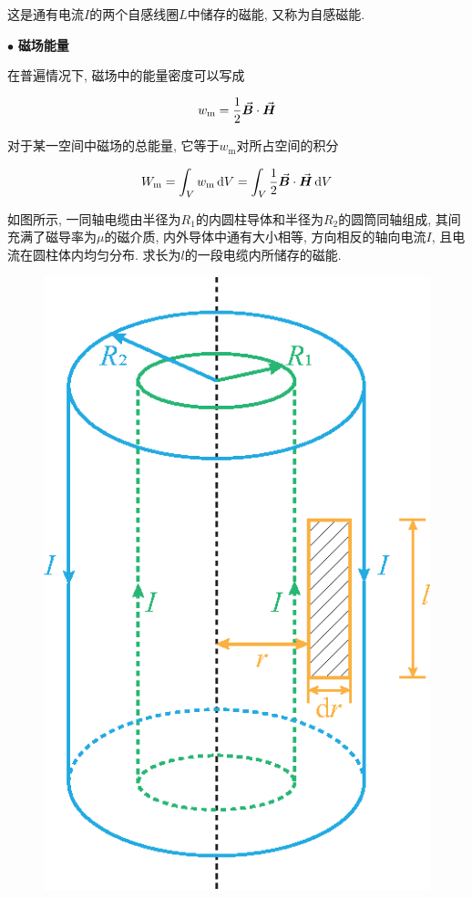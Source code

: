 这是通有电流$I$的两个自感线圈$L$中储存的磁能, 又称为自感磁能. 

$\bullet$ \textbf{磁场能量}

在普遍情况下, 磁场中的能量密度可以写成

\begin{equation}
	w_{\textrm{m}} = \dfrac{1}{2} \va*{B} \cdot \va*{H} \label{C9-eq19}
\end{equation}

对于某一空间中磁场的总能量, 它等于$w_{\textrm{m}}$对所占空间的积分

\begin{equation}
	W_{\textrm{m}} = \int_{V} w_{\textrm{m}} \dd{V} = \int_{V} \dfrac{1}{2} \va*{B} \cdot \va*{H} \dd{V}
\end{equation}

\begin{example}
	如图所示, 一同轴电缆由半径为$R_1$的内圆柱导体和半径为$R_2$的圆筒同轴组成, 其间充满了磁导率为$\mu$的磁介质, 内外导体中通有大小相等, 方向相反的轴向电流$I$, 且电流在圆柱体内均匀分布. 求长为$l$的一段电缆内所储存的磁能. 
	
	\begin{figure}[H]
		\centering
		\includegraphics[scale=0.8]{C9-fig7.eps}
	\end{figure}
	

\end{example}
